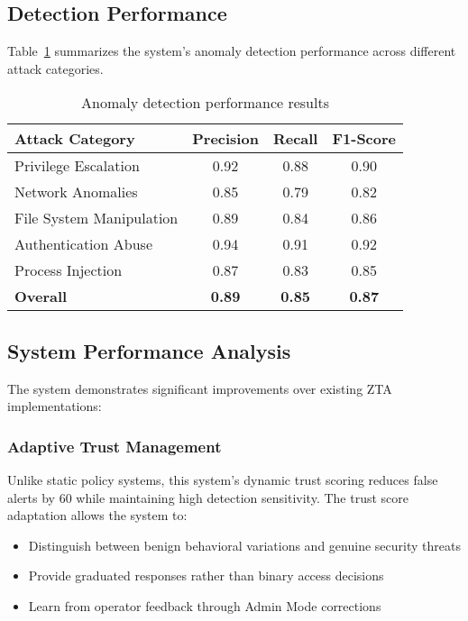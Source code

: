 \documentclass[conference]{IEEEtran}
\begin{document}
\subsection{Detection Performance}
Table~\ref{tab:detection_results} summarizes the system’s anomaly detection performance across different attack categories.

\begin{table}[t]
\centering
\caption{Anomaly detection performance results}
\begin{tabular}{@{}lccc@{}}
\toprule
\textbf{Attack Category} & \textbf{Precision} & \textbf{Recall} & \textbf{F1-Score} \\
\midrule
Privilege Escalation & 0.92 & 0.88 & 0.90 \\
Network Anomalies & 0.85 & 0.79 & 0.82 \\
File System Manipulation & 0.89 & 0.84 & 0.86 \\
Authentication Abuse & 0.94 & 0.91 & 0.92 \\
Process Injection & 0.87 & 0.83 & 0.85 \\
\midrule
\textbf{Overall} & \textbf{0.89} & \textbf{0.85} & \textbf{0.87} \\
\bottomrule
\end{tabular}
\label{tab:detection_results}
\end{table}

\subsection{System Performance Analysis}
The system demonstrates significant improvements over
existing ZTA implementations:

\subsubsection{Adaptive Trust Management}
Unlike static policy systems, this system's dynamic trust scoring reduces false alerts by 60%
while maintaining high detection sensitivity. The trust score
adaptation allows the system to:
\begin{itemize}[leftmargin=*]
  \item Distinguish between benign behavioral variations and genuine security threats
  \item Provide graduated responses rather than binary access
decisions  
  \item Learn from operator feedback through Admin Mode corrections
\end{itemize}
\end{document}
